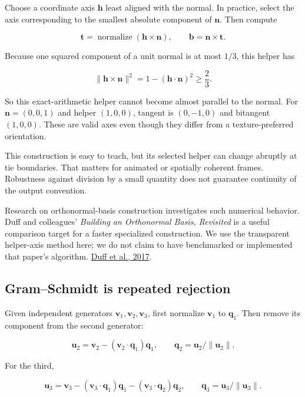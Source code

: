 Choose a coordinate axis \(\mathbf h\) least aligned with the normal. In practice, select the axis corresponding to the smallest absolute component of \(\mathbf n\). Then compute

\[
\mathbf t=\operatorname{normalize}(\mathbf h\times\mathbf n),
\qquad \mathbf b=\mathbf n\times\mathbf t.
\]

Because one squared component of a unit normal is at most \(1/3\), this helper has

\[
\|\mathbf h\times\mathbf n\|^2
=1-(\mathbf h\cdot\mathbf n)^2\ge\frac23.
\]

So this exact-arithmetic helper cannot become almost parallel to the normal. For \(\mathbf n=(0,0,1)\) and helper \((1,0,0)\), tangent is \((0,-1,0)\) and bitangent \((1,0,0)\). These are valid axes even though they differ from a texture-preferred orientation.

This construction is easy to teach, but its selected helper can change abruptly at tie boundaries. That matters for animated or spatially coherent frames. Robustness against division by a small quantity does not guarantee continuity of the output convention.

Research on orthonormal-basis construction investigates such numerical behavior. Duff and colleagues' \emph{Building an Orthonormal Basis, Revisited} is a useful comparison target for a faster specialized construction. We use the transparent helper-axis method here; we do not claim to have benchmarked or implemented that paper's algorithm. \href{https://graphics.pixar.com/library/OrthonormalB/paper.pdf}{Duff et al., 2017}.

\subsection{Gram--Schmidt is repeated rejection}\label{01-foundations-i-ch017-gramschmidt-is-repeated-rejection}

Given independent generators \(\mathbf v_1,\mathbf v_2,\mathbf v_3\), first normalize \(\mathbf v_1\) to \(\mathbf q_1\). Then remove its component from the second generator:

\[
\mathbf u_2=\mathbf v_2-(\mathbf v_2\cdot\mathbf q_1)\mathbf q_1,
\qquad \mathbf q_2=\mathbf u_2/\|\mathbf u_2\|.
\]

For the third,

\[
\mathbf u_3=\mathbf v_3
-(\mathbf v_3\cdot\mathbf q_1)\mathbf q_1
-(\mathbf v_3\cdot\mathbf q_2)\mathbf q_2,
\qquad \mathbf q_3=\mathbf u_3/\|\mathbf u_3\|.
\]


